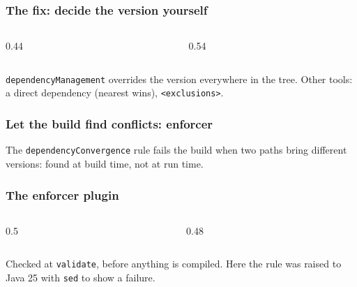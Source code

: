 \documentclass[aspectratio=169,10pt,compress]{beamer}
\begin{document}
\begin{frame}[t,fragile] \frametitle{The fix: decide the version yourself}
  \begin{columns}[T]
    \begin{column}{0.44\textwidth}
    \end{column}
    \begin{column}{0.54\textwidth}
    \end{column}
  \end{columns}
  \vspace{0.2em}
  \small \texttt{dependencyManagement} overrides the version everywhere in the tree. Other tools: a direct dependency (nearest wins), \texttt{<exclusions>}.
\end{frame}




\begin{frame}[t,fragile] \frametitle{Let the build find conflicts: enforcer}

  \vspace{0.1em}
  \small
  The \texttt{dependencyConvergence} rule fails the build when two paths bring different versions: found at build time, not at run time.
\end{frame}





\begin{frame}[t,fragile] \frametitle{The enforcer plugin}
  \begin{columns}[T]
    \begin{column}{0.5\textwidth}
    \end{column}
    \begin{column}{0.48\textwidth}
    \end{column}
  \end{columns}
  \vspace{0.2em}
  \small Checked at \texttt{validate}, before anything is compiled. Here the rule was raised to Java 25 with \texttt{sed} to show a failure.
\end{frame}
\end{document}
